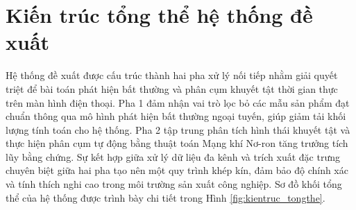 \section{Kiến trúc tổng thể hệ thống đề xuất}
\label{sec:kientruc_tongthe}

Hệ thống đề xuất được cấu trúc thành hai pha xử lý nối tiếp nhằm giải quyết triệt để bài toán phát hiện bất thường và phân cụm khuyết tật thời gian thực trên màn hình điện thoại. Pha 1 đảm nhận vai trò lọc bỏ các mẫu sản phẩm đạt chuẩn thông qua mô hình phát hiện bất thường ngoại tuyến, giúp giảm tải khối lượng tính toán cho hệ thống. Pha 2 tập trung phân tích hình thái khuyết tật và thực hiện phân cụm tự động bằng thuật toán Mạng khí Nơ-ron tăng trưởng tích lũy bằng chứng. Sự kết hợp giữa xử lý dữ liệu đa kênh và trích xuất đặc trưng chuyên biệt giữa hai pha tạo nên một quy trình khép kín, đảm bảo độ chính xác và tính thích nghi cao trong môi trường sản xuất công nghiệp. Sơ đồ khối tổng thể của hệ thống được trình bày chi tiết trong Hình \ref{fig:kientruc_tongthe}.

